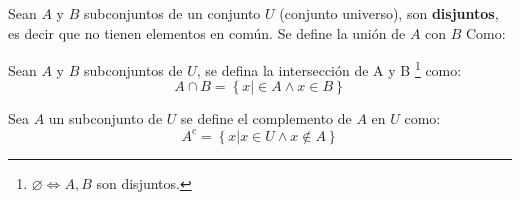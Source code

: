 \begin{definition}
	Sean $A$ y $B$ subconjuntos de un conjunto $U$ (conjunto universo), son \textbf{disjuntos}, es decir que no tienen elementos en común. Se define la unión de $A$ con $B$ Como:
\end{definition}

\begin{center}
\end{center}

\begin{definition}[Intersección]
	Sean $A$ y $B$ subconjuntos de $U$, se defina la intersección de A y B \footnote{$\varnothing \Leftrightarrow A,B$ son disjuntos.} como:
	\begin{equation}
		A \cap B = \left\{ x\vert \in  A \wedge x\in B \right\}
	\end{equation}
\end{definition}

\begin{center}
\end{center}

\begin{definition}[Complemento]
	Sea $A$ un subconjunto de $U$ se define el complemento de $A$ en $U$ como:
	\begin{equation}
		A^{c}= \left\{ x\vert x\in  U \wedge x \notin  A \right\}
	\end{equation}
\end{definition}

\begin{center}
\end{center}

